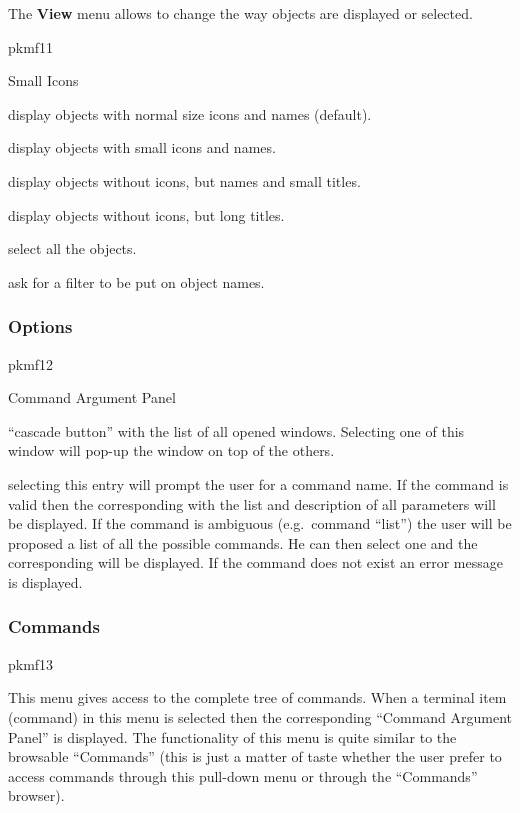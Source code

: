 The \textbf{View} menu allows to change the way objects are displayed
or selected. 

\begin{PICTf}[.17]{pkmf11}
\begin{DLsf}{Small Icons}
\item[Icons]
         display objects with normal size icons and names (default). 
\item[Small Icons]
         display objects with small icons and names.
\item[No Icons]
         display objects without icons, but names and small titles.
\item[Titles]
         display objects without icons, but long titles.
\item[Select All]
         select all the objects.
\item[Filter...]
         ask for a filter to be put on object names.
\end{DLsf}
\end{PICTf}

\subsubsection*{Options}
\begin{PICTf}[.3] {pkmf12}
\end{PICTf}

\begin{DLsf}{Command Argument Panel}
\item[Raise Window]
     ``cascade button'' with the list of all
     opened windows. Selecting one of this window will pop-up the
     window on top of the others.
\item[Command Argument Panel]
     selecting this entry will
     prompt the user for a command name. If the command is valid
     then the corresponding \CAP{} with the list
     and description of all parameters will be displayed. If the
     command is ambiguous (e.g.\ command ``list'') the user
     will be proposed a list of all the possible commands. He can
     then select one and the corresponding \CAP{} will be displayed.
     If the command does not exist an error message is displayed.
\end{DLsf}


\subsubsection*{Commands}
\begin{PICTf}[.6] {pkmf13}
\begin{DLsf}{}
\item[]
  This menu gives access to the complete tree of commands. When a terminal item
(command) in this menu is selected then the corresponding ``Command Argument 
Panel'' is displayed. The functionality of this menu is quite similar to the 
browsable ``Commands'' (this is just a matter of taste whether the user prefer 
to access commands through this pull-down menu or through the ``Commands'' 
browser).
\end{DLsf}
\end{PICTf}

